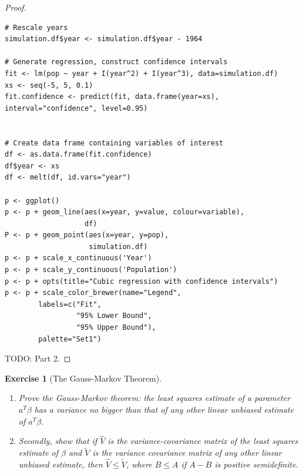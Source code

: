 \documentclass[12pt]{amsart}
\theoremstyle{plain}%
\newtheorem{exer}[thm]{Exercise}
\theoremstyle{definition}
\theoremstyle{remark}
\begin{document}
\begin{proof}
\begin{lstlisting}
# Rescale years
simulation.df$year <- simulation.df$year - 1964

# Generate regression, construct confidence intervals
fit <- lm(pop ~ year + I(year^2) + I(year^3), data=simulation.df)
xs <- seq(-5, 5, 0.1)
fit.confidence <- predict(fit, data.frame(year=xs), interval="confidence", level=0.95)


# Create data frame containing variables of interest
df <- as.data.frame(fit.confidence)
df$year <- xs
df <- melt(df, id.vars="year")

p <- ggplot()
p <- p + geom_line(aes(x=year, y=value, colour=variable),
                   df)
P <- p + geom_point(aes(x=year, y=pop), 
                    simulation.df)
p <- p + scale_x_continuous('Year') 
p <- p + scale_y_continuous('Population')
p <- p + opts(title="Cubic regression with confidence intervals")
p <- p + scale_color_brewer(name="Legend",
        labels=c("Fit", 
                 "95% Lower Bound", 
                 "95% Upper Bound"), 
        palette="Set1")
\end{lstlisting}

    TODO: Part 2.
\end{proof}

\begin{exer}[The Gauss-Markov Theorem]
    \begin{enumerate}
    \item Prove the Gauss-Markov theorem: the least squares estimate of a parameter $a^T\beta$ has a variance no bigger than that of any other linear unbiased estimate of $a^T\beta$.

    \item Secondly, show that if $\hat V$ is the variance-covariance matrix of the least squares estimate of $\beta$ and $\tilde V$ is the variance covariance matrix of any other linear unbiased estimate, then $\hat V \leq \tilde V$, where $B \leq A$ if $A - B$ is positive semidefinite.
    \end{enumerate}
\end{exer}
\end{document}
